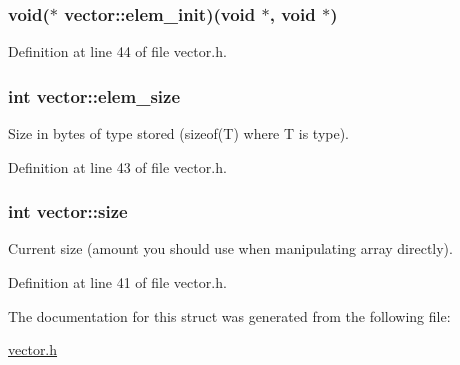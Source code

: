 \hypertarget{structvector_a9aa1b736be034d1734173299ba7874e2}{
\subsubsection[{elem\-\_\-init}]{\setlength{\rightskip}{0pt plus 5cm}void($\ast$ {\bf vector\-::elem\-\_\-init})(void $\ast$, void $\ast$)}}\label{structvector_a9aa1b736be034d1734173299ba7874e2}


\-Definition at line 44 of file vector.\-h.

\hypertarget{structvector_a1e2d06aaea690d5420fc153fa9b8c2b8}{
\subsubsection[{elem\-\_\-size}]{\setlength{\rightskip}{0pt plus 5cm}int {\bf vector\-::elem\-\_\-size}}}\label{structvector_a1e2d06aaea690d5420fc153fa9b8c2b8}


\-Size in bytes of type stored (sizeof(\-T) where \-T is type). 



\-Definition at line 43 of file vector.\-h.

\hypertarget{structvector_a211c6f9096b87e1ff8b09ad5ad373e61}{
\subsubsection[{size}]{\setlength{\rightskip}{0pt plus 5cm}int {\bf vector\-::size}}}\label{structvector_a211c6f9096b87e1ff8b09ad5ad373e61}


\-Current size (amount you should use when manipulating array directly). 



\-Definition at line 41 of file vector.\-h.



\-The documentation for this struct was generated from the following file\-:\begin{DoxyCompactItemize}
\item 
\hyperlink{vector_8h}{vector.\-h}\end{DoxyCompactItemize}
